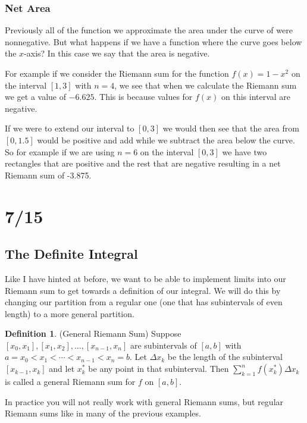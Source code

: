 \documentclass[12pt,reqno]{article}
\theoremstyle{definition}
\newtheorem*{Definition}{Definition}
\begin{document}
\subsubsection{Net Area}

Previously all of the function we approximate the area under the curve of were nonnegative. But what happens if we have a function where the curve goes below the $x$-axis? In this case we say that the area is negative. 

For example if we consider the Riemann sum for the function $f(x) = 1 - x^2$ on the interval $[1, 3]$ with $n = 4$, we see that when we calculate the Riemann sum we get a value of $-6.625$. This is because values for $f(x)$ on this interval are negative. 

If we were to extend our interval to $[0, 3]$ we would then see that the area from $[0, 1.5]$ would be positive and add while we subtract the area below the curve. So for example if we are using $n = 6$ on the interval $[0, 3]$ we have two rectangles that are positive and the rest that are negative resulting in a net Riemann sum of -3.875. 

\section{7/15} 
\subsection{The Definite Integral} 

Like I have hinted at before, we want to be able to implement limits into our Riemann sum to get towards a definition of our integral. We will do this by changing our partition from a regular one (one that has subintervals of even length) to a more general partition. 

\begin{Definition}
	(General Riemann Sum) Suppose $[x_0, x_1], [x_1, x_2], \ldots, [x_{n - 1}, x_n]$ are subintervals of $[a, b]$ with $a = x_0 < x_1 < \cdots < x_{n - 1} < x_n = b$. Let $\Delta x_k$ be the length of the subinterval $[x_{ k -1}, x_k]$ and let $x_{k}^*$ be any point in that subinterval. Then $\sum_{k = 1}^{n} f(x_{k}^{*}) \Delta x_k$ is called a general Riemann sum for $f$ on $[a, b]$. 
\end{Definition}

In practice you will not really work with general Riemann sums, but regular Riemann sums like in many of the previous examples. 
\end{document}
